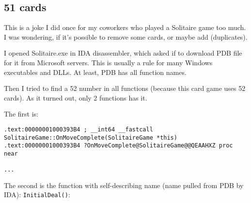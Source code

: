 \subsection{51 cards}

\renewcommand{\CURPATH}{examples/solitaire/51}

This is a joke I did once for my coworkers who played a Solitaire game too much.
I was wondering, if it's possible to remove some cards, or maybe add (duplicates).

I opened Solitaire.exe in IDA disassembler, which asked if to download PDB file for it from Microsoft servers.
This is usually a rule for many Windows executables and DLLs.
At least, PDB has all function names.

Then I tried to find a 52 number in all functions (because this card game uses 52 cards).
As it turned out, only 2 functions has it.

The first is:

\begin{lstlisting}
.text:00000001000393B4 ; __int64 __fastcall SolitaireGame::OnMoveComplete(SolitaireGame *this)
.text:00000001000393B4 ?OnMoveComplete@SolitaireGame@@QEAAHXZ proc near

...
\end{lstlisting}

The second is the function with self-describing name (name pulled from PDB by IDA): \verb|InitialDeal()|:

